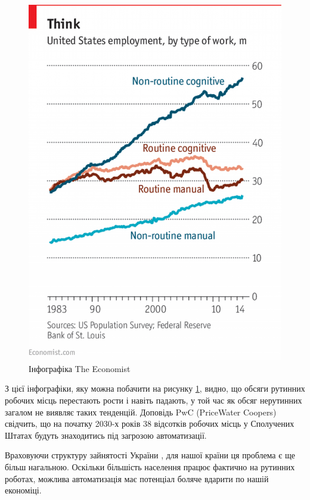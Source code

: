         \begin{figure}[!htp]
            \centering
            \includegraphics[scale = 0.19]{PNG/economist.png}
            \caption{Інфографіка The Economist}
            \label{fig:economist}
        \end{figure}

        З цієї інфографіки, яку можна побачити на рисунку \ref{fig:economist}, видно, що обсяги рутинних робочих місць перестають
        рости і навіть падають, у той час як обсяг нерутинних загалом не виявляє таких тенденцій. Доповідь PwC (PriceWater Coopers) 
        \cite{pwc} свідчить, що на початку 2030-х років 38 відсотків робочих місць у Сполучених Штатах будуть знаходитись під
        загрозою автоматизації.

        Враховуючи структуру зайнятості України \cite{ukrstatemployment}, для нашої країни ця проблема є ще більш нагальною. 
        Оскільки більшість населення працює фактично на рутинних роботах, можлива автоматизація має потенціал боляче вдарити по нашій
        економіці.

